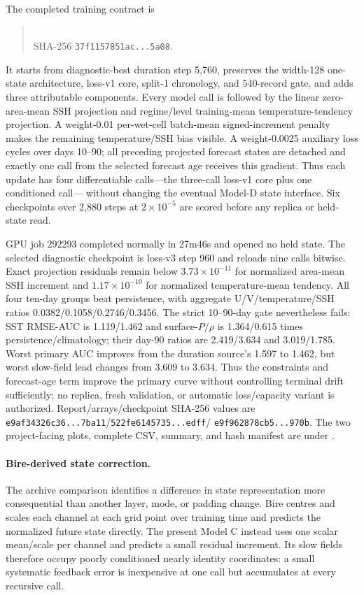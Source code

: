 \documentclass[11pt]{article}
\begin{document}
The completed training contract is
\begin{quote}
\\
SHA-256 \texttt{37f1157851ac...5a08}.
\end{quote}
It starts from diagnostic-best duration step 5,760, preserves the width-128
one-state architecture, loss-v1 core, split-1 chronology, and 540-record gate, and
adds three attributable components.  Every model call is followed by the linear
zero-area-mean SSH projection and regime/level training-mean temperature-tendency
projection.  A weight-0.01 per-wet-cell batch-mean signed-increment penalty makes the
remaining temperature/SSH bias visible.  A weight-0.0025 auxiliary loss cycles over
days 10--90; all preceding projected forecast states are detached and exactly one
call from the selected forecast age receives this gradient.  Thus each update has
four differentiable calls---the three-call loss-v1 core plus one conditioned call---
without changing the eventual Model-D state interface.  Six checkpoints over 2,880
steps at \(2\times10^{-5}\) are scored before any replica or held-state read.

GPU job 292293 completed normally in 27m46s and opened no held state.  The selected
diagnostic checkpoint is loss-v3 step 960 and reloads nine calls bitwise.  Exact
projection residuals remain below \(3.73\times10^{-11}\) for normalized
area-mean SSH increment and \(1.17\times10^{-10}\) for normalized
temperature-mean tendency.  All four ten-day groups beat persistence, with aggregate
U/V/temperature/SSH ratios 0.0382/0.1058/0.2746/0.3456.  The strict 10--90-day gate
nevertheless fails: SST RMSE-AUC is 1.119/1.462 and surface-\(P/\rho\) is
1.364/0.615 times persistence/climatology; their day-90 ratios are
2.419/3.634 and 3.019/1.785.  Worst primary AUC improves from the duration
source's 1.597 to 1.462, but worst slow-field lead changes from 3.609 to 3.634.
Thus the constraints and forecast-age term improve the primary curve without
controlling terminal drift sufficiently; no replica, fresh validation, or automatic
loss/capacity variant is authorized.  Report/arrays/checkpoint SHA-256 values are
\texttt{e9af34326c36...7ba11}/\texttt{522fe6145735...edff}/
\texttt{e9f962878cb5...970b}.  The two project-facing plots, complete CSV, summary,
and hash manifest are under
.

\paragraph{Bire-derived state correction.}
The archive comparison identifies a difference in state representation more consequential
than another layer, mode, or padding change.  Bire centres and scales each channel at
each grid point over training time and predicts the normalized future state directly.
The present Model C instead uses one scalar mean/scale per channel and predicts a small
residual increment.  Its slow fields therefore occupy poorly conditioned nearly
identity coordinates: a small systematic feedback error is inexpensive at one call but
accumulates at every recursive call.
\end{document}
